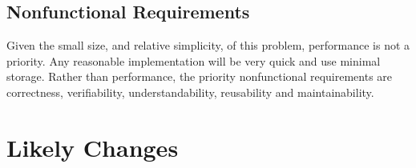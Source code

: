 \documentclass[12pt]{article}
\newcommand{\iref}[1]{IM\ref{#1}}
\newcounter{reqnum} %
\begin{document}
\begin{itemize}





\end{itemize}

\subsection{Nonfunctional Requirements}

Given the small size, and relative simplicity, of this problem, performance is
not a priority.  Any reasonable implementation will be very quick and use
minimal storage.  Rather than performance, the priority nonfunctional
requirements are correctness, verifiability, understandability, reusability and
maintainability.

\section{Likely Changes}    
\end{document}
